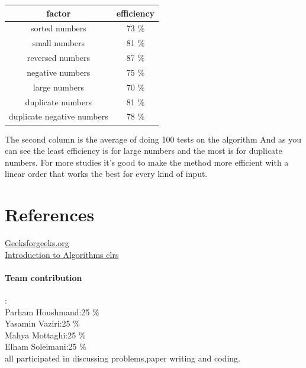 \documentclass[
10pt, %
a4paper, %
oneside, %
headinclude,footinclude, %
BCOR5mm, %
]{scrartcl}
\begin{document}
\begin{table}[ht]
\centering
\begin{tabular}{|c|c|}
\hline
 factor & efficiency\\
 \hline
 \hline
 sorted numbers & 73 \% \\
 \hline
 small numbers & 81 \% \\
 \hline
 reversed numbers & 87 \% \\
 \hline
 negative numbers & 75 \% \\
 \hline
 large numbers & 70 \% \\
 \hline
 duplicate numbers & 81 \% \\
 \hline 
 duplicate negative numbers & 78 \% \\
 \hline
 

\end{tabular}
\end{table}




The second column is the average of doing 100 tests on the algorithm And as you can see the least efficiency is for large numbers and the most is for duplicate numbers. For more studies it's good to make the method more efficient with a linear order that works the best for every kind of input.


\section{References}
 \href{https://www.geeksforgeeks.org/}{Geeksforgeeks.org}
 \\
 \href{https://www.amazon.com/Introduction-Algorithms-3rd-MIT-Press/dp/0262033844}{Introduction to Algorithms clrs}
 

\paragraph{Team contribution} :
\\
Parham Houshmand:25 \%
\\
Yasamin Vaziri:25 \%
\\
Mahya Mottaghi:25 \% 
\\
Elham Soleimani:25 \%
\\
all participated in discussing problems,paper writing and coding.
\label{fig:esempio}



\renewcommand{\refname}{\spacedlowsmallcaps{References}} %



 
\end{document}
